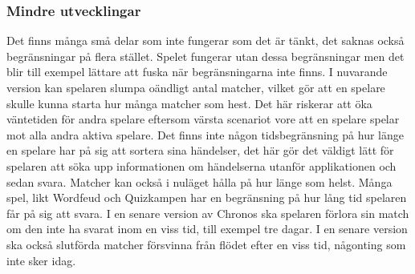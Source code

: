 \documentclass[a4paper, 11pt]{article}
\begin{document}
\subsubsection{Mindre utvecklingar}
Det finns många små delar som inte fungerar som det är tänkt, det saknas också begränsningar på flera stället. Spelet fungerar utan dessa begränsningar men det blir till exempel lättare att fuska när begränsningarna inte finns. I nuvarande version kan spelaren slumpa oändligt antal matcher, vilket gör att en spelare skulle kunna starta hur många matcher som hest. Det här riskerar att öka väntetiden för andra spelare eftersom värsta scenariot vore att en spelare spelar mot alla andra aktiva spelare. Det finns inte någon tidsbegränsning på hur länge en spelare har på sig att sortera sina händelser, det här gör det väldigt lätt för spelaren att söka upp informationen om händelserna utanför applikationen och sedan svara. Matcher kan också i nuläget hålla på hur länge som helst. Många spel, likt Wordfeud och Quizkampen har en begränsning på hur lång tid spelaren får på sig att svara. I en senare version av Chronos ska spelaren förlora sin match om den inte ha svarat inom en viss tid, till exempel tre dagar. I en senare version ska också slutförda matcher försvinna från flödet efter en viss tid, någonting som inte sker idag.

\newpage
\printbibliography[title={Referenser}]
\end{document}
